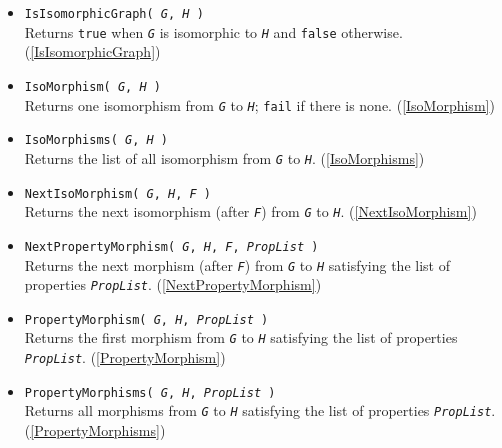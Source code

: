 \documentclass[a4paper,11pt]{report}
\begin{document}
{{\begin{itemize}
\item \texttt{IsIsomorphicGraph( \mbox{\texttt{\mdseries\slshape G}}, \mbox{\texttt{\mdseries\slshape H}} )}\\
 Returns \texttt{true} when \mbox{\texttt{\mdseries\slshape G}} is isomorphic to \mbox{\texttt{\mdseries\slshape H}} and \texttt{false} otherwise. (\ref{IsIsomorphicGraph}) 
\item \texttt{IsoMorphism( \mbox{\texttt{\mdseries\slshape G}}, \mbox{\texttt{\mdseries\slshape H}} )}\\
 Returns one isomorphism from \mbox{\texttt{\mdseries\slshape G}} to \mbox{\texttt{\mdseries\slshape H}}; \texttt{fail} if there is none. (\ref{IsoMorphism}) 
\item \texttt{IsoMorphisms( \mbox{\texttt{\mdseries\slshape G}}, \mbox{\texttt{\mdseries\slshape H}} )}\\
 Returns the list of all isomorphism from \mbox{\texttt{\mdseries\slshape G}} to \mbox{\texttt{\mdseries\slshape H}}. (\ref{IsoMorphisms}) 
\item \texttt{NextIsoMorphism( \mbox{\texttt{\mdseries\slshape G}}, \mbox{\texttt{\mdseries\slshape H}}, \mbox{\texttt{\mdseries\slshape F}} )}\\
 Returns the next isomorphism (after \mbox{\texttt{\mdseries\slshape F}}) from \mbox{\texttt{\mdseries\slshape G}} to \mbox{\texttt{\mdseries\slshape H}}. (\ref{NextIsoMorphism}) 
\item \texttt{NextPropertyMorphism( \mbox{\texttt{\mdseries\slshape G}}, \mbox{\texttt{\mdseries\slshape H}}, \mbox{\texttt{\mdseries\slshape F}}, \mbox{\texttt{\mdseries\slshape PropList}} )}\\
 Returns the next morphism (after \mbox{\texttt{\mdseries\slshape F}}) from \mbox{\texttt{\mdseries\slshape G}} to \mbox{\texttt{\mdseries\slshape H}} satisfying the list of properties \mbox{\texttt{\mdseries\slshape PropList}}. (\ref{NextPropertyMorphism}) 
\item \texttt{PropertyMorphism( \mbox{\texttt{\mdseries\slshape G}}, \mbox{\texttt{\mdseries\slshape H}}, \mbox{\texttt{\mdseries\slshape PropList}} )}\\
 Returns the first morphism from \mbox{\texttt{\mdseries\slshape G}} to \mbox{\texttt{\mdseries\slshape H}} satisfying the list of properties \mbox{\texttt{\mdseries\slshape PropList}}. (\ref{PropertyMorphism}) 
\item \texttt{PropertyMorphisms( \mbox{\texttt{\mdseries\slshape G}}, \mbox{\texttt{\mdseries\slshape H}}, \mbox{\texttt{\mdseries\slshape PropList}} )}\\
 Returns all morphisms from \mbox{\texttt{\mdseries\slshape G}} to \mbox{\texttt{\mdseries\slshape H}} satisfying the list of properties \mbox{\texttt{\mdseries\slshape PropList}}. (\ref{PropertyMorphisms}) 
\end{itemize}
 }

}
\end{document}
